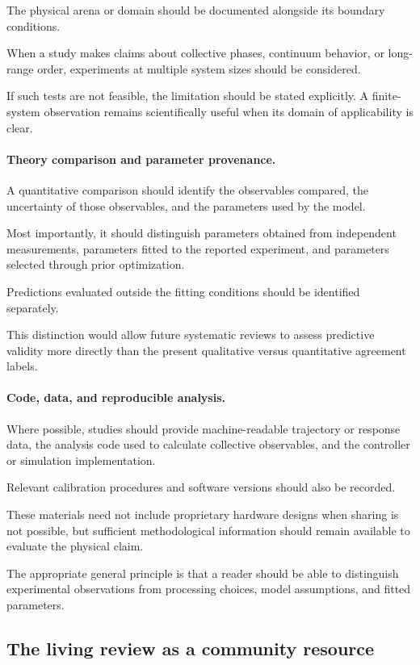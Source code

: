 The physical arena or domain
should be documented alongside
its boundary conditions.

When a study makes claims
about collective phases,
continuum behavior,
or long-range order,
experiments at multiple
system sizes should be
considered.

If such tests are not feasible,
the limitation should be
stated explicitly.
A finite-system observation
remains scientifically useful
when its domain of
applicability is clear.

\paragraph*{Theory comparison and parameter provenance.}

A quantitative comparison should
identify the observables compared,
the uncertainty of those
observables, and the parameters
used by the model.

Most importantly, it should
distinguish parameters obtained
from independent measurements,
parameters fitted to the
reported experiment,
and parameters selected
through prior optimization.

Predictions evaluated outside
the fitting conditions
should be identified separately.

This distinction would allow
future systematic reviews
to assess predictive validity
more directly than the
present qualitative versus
quantitative agreement labels.

\paragraph*{Code, data, and reproducible analysis.}

Where possible, studies should
provide machine-readable
trajectory or response data,
the analysis code used to
calculate collective observables,
and the controller or simulation
implementation.

Relevant calibration procedures
and software versions should
also be recorded.

These materials need not
include proprietary hardware
designs when sharing is
not possible, but sufficient
methodological information
should remain available
to evaluate the physical claim.

The appropriate general
principle is that a reader
should be able to distinguish
experimental observations
from processing choices,
model assumptions,
and fitted parameters.

\subsection{The living review as a community resource}
\label{sec:outlook-living}

